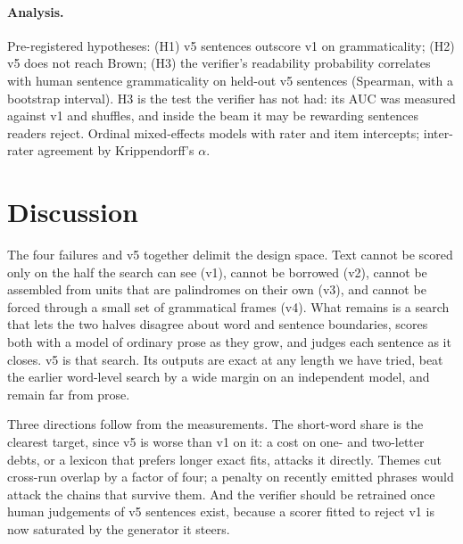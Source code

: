 \documentclass[11pt]{article}
\begin{document}
\paragraph{Analysis.} Pre-registered hypotheses: (H1) v5 sentences outscore v1 on grammaticality; (H2) v5 does not reach Brown; (H3) the verifier's readability probability correlates with human sentence grammaticality on held-out v5 sentences (Spearman, with a bootstrap interval). H3 is the test the verifier has not had: its AUC was measured against v1 and shuffles, and inside the beam it may be rewarding sentences readers reject. Ordinal mixed-effects models with rater and item intercepts; inter-rater agreement by Krippendorff's $\alpha$.

\section{Discussion}

The four failures and v5 together delimit the design space. Text cannot be scored only on the half the search can see (v1), cannot be borrowed (v2), cannot be assembled from units that are palindromes on their own (v3), and cannot be forced through a small set of grammatical frames (v4). What remains is a search that lets the two halves disagree about word and sentence boundaries, scores both with a model of ordinary prose as they grow, and judges each sentence as it closes. v5 is that search. Its outputs are exact at any length we have tried, beat the earlier word-level search by a wide margin on an independent model, and remain far from prose.

Three directions follow from the measurements. The short-word share is the clearest target, since v5 is worse than v1 on it: a cost on one- and two-letter debts, or a lexicon that prefers longer exact fits, attacks it directly. Themes cut cross-run overlap by a factor of four; a penalty on recently emitted phrases would attack the chains that survive them. And the verifier should be retrained once human judgements of v5 sentences exist, because a scorer fitted to reject v1 is now saturated by the generator it steers.
\end{document}
